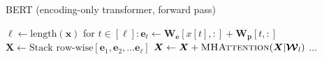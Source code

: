 \documentclass[12pt,aspectratio=169,handout]{beamer}
\begin{document}
\begin{frame}{BERT (encoding-only transformer, forward pass)}

\vspace{-2em}
\begin{minipage}[t][10cm][t]{15cm}
\begin{algorithmic}[1]
\State $\ell \gets \text{length}(\bm{x})$
\State for $t \in [\ell]: \bm{e}_t \gets \bm{W_e}[x[t],:] + \bm{W_p}[t,:]$
\State $\bm{X} \gets \text{Stack row-wise}[\bm{e}_1, \bm{e}_2, \ldots \bm{e}_{\ell}]$
\State $\bm{X} \gets \bm{X} + \textsc{MHAttention}(\bm{X} | \bm{\mathcal{W}}_l)$
\State $\ldots$
\EndFor
\EndFunction
\end{algorithmic}

\end{minipage}
\end{frame}
\end{document}
